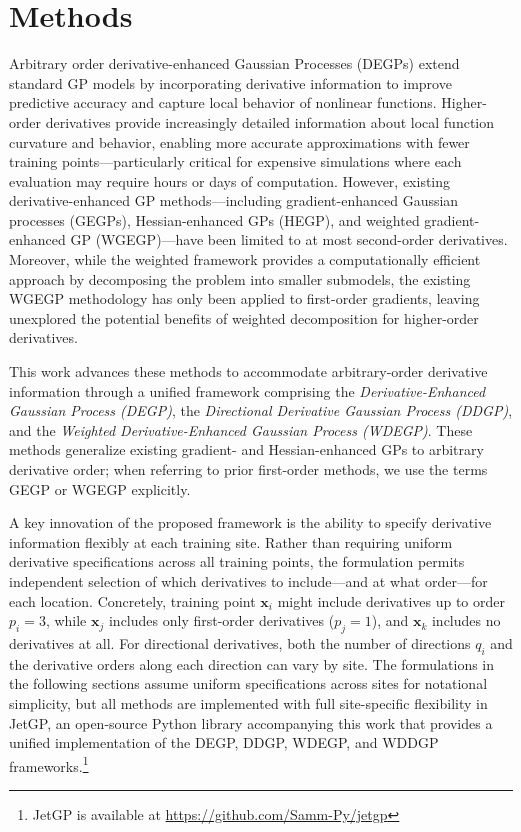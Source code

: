 \documentclass[12pt]{article}
\begin{document}
\section{Methods}
\label{sec:methods}
Arbitrary order derivative-enhanced Gaussian Processes (DEGPs) extend standard GP models by 
incorporating derivative information to improve predictive accuracy and capture 
local behavior of nonlinear functions. Higher-order derivatives provide increasingly 
detailed information about local function curvature and behavior, enabling more 
accurate approximations with fewer training points—particularly critical for 
expensive simulations where each evaluation may require hours or days of computation. 
However, existing derivative-enhanced GP methods—including gradient-enhanced 
Gaussian processes (GEGPs), Hessian-enhanced GPs (HEGP), and weighted gradient-enhanced GP
(WGEGP)—have been limited to at most second-order derivatives. Moreover, while
the weighted framework provides a computationally efficient approach by decomposing
the problem into smaller submodels, the existing WGEGP methodology has only been applied
to first-order gradients, leaving unexplored the potential benefits of weighted 
decomposition for higher-order derivatives.

This work advances these methods to accommodate arbitrary-order derivative 
information through a unified framework comprising the \textit{Derivative-Enhanced 
	Gaussian Process (DEGP)}, the \textit{Directional Derivative Gaussian Process 
	(DDGP)}, and the \textit{Weighted Derivative-Enhanced Gaussian Process (WDEGP)}. These methods generalize existing gradient- and Hessian-enhanced GPs to arbitrary derivative order; when referring to prior first-order methods, we use the terms GEGP or WGEGP explicitly.

A key innovation of the proposed framework is the ability to specify derivative 
information flexibly at each training site. Rather than requiring uniform derivative 
specifications across all training points, the formulation permits independent 
selection of which derivatives to include—and at what order—for each location. 
Concretely, training point $\mathbf{x}_i$ might include derivatives up to order $p_i = 3$, 
while $\mathbf{x}_j$ includes only first-order derivatives ($p_j = 1$), and $\mathbf{x}_k$ 
includes no derivatives at all. For directional derivatives, both the number of 
directions $q_i$ and the derivative orders along each direction can vary by site. 
The formulations in the following sections assume uniform specifications across sites 
for notational simplicity, but all methods are implemented with full site-specific 
flexibility in JetGP, an open-source Python library accompanying this work that provides 
a unified implementation of the DEGP, DDGP, WDEGP, and WDDGP frameworks.\footnote{JetGP is available at \url{https://github.com/Samm-Py/jetgp}}
\end{document}
